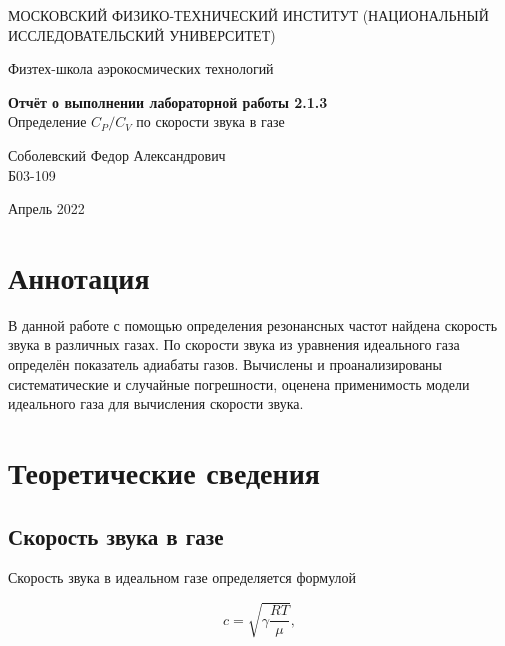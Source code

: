 \documentclass[a4paper,12pt]{article} %
\date{\today}
\begin{document}
\begin{titlepage}
	\begin{center}
		{\large МОСКОВСКИЙ ФИЗИКО-ТЕХНИЧЕСКИЙ ИНСТИТУТ (НАЦИОНАЛЬНЫЙ ИССЛЕДОВАТЕЛЬСКИЙ УНИВЕРСИТЕТ)}
	\end{center}
	\begin{center}
		{\large Физтех-школа аэрокосмических технологий}
	\end{center}
	
	
	\vspace{4.5cm}
	{\huge
		\begin{center}
			{\bf Отчёт о выполнении лабораторной работы 2.1.3}\\
			Определение $C_P/C_V$ по скорости звука в газе
		\end{center}
	}
	\vspace{1cm}
	\begin{center}
		{\large Соболевский Федор Александрович \\
			\vspace{0.2cm}
			Б03-109}
	\end{center}
	\vspace{8cm}
	\begin{center}
		Апрель 2022
	\end{center}
\end{titlepage}

\section{Аннотация}

В данной работе с помощью определения резонансных частот найдена скорость звука в различных газах. По скорости звука из уравнения идеального газа определён показатель адиабаты газов. Вычислены и проанализированы систематические и случайные погрешности, оценена применимость модели идеального газа для вычисления скорости звука.

\section{Теоретические сведения}

\subsection{Скорость звука в газе}

Скорость звука в идеальном газе определяется формулой

\begin{equation}
    c = \sqrt{\gamma\frac{RT}{\mu}},
\end{equation}
\end{document}

